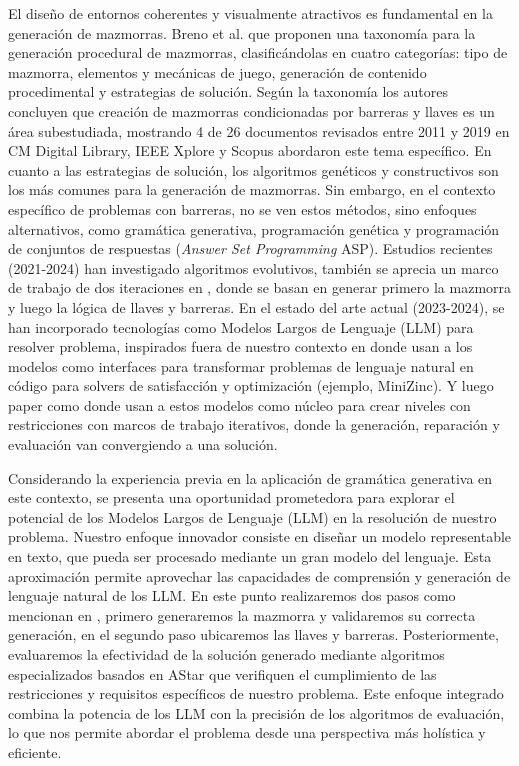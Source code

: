 \documentclass[letter, 10pt]{article}
\begin{document}
El dise\~no de entornos coherentes y visualmente atractivos es fundamental en la generaci\'on de mazmorras. Breno et al. \cite{viana2019PDG} que proponen una taxonom\'ia para la generaci\'on procedural de mazmorras, clasific\'andolas en cuatro categor\'ias: tipo de mazmorra, elementos y mec\'anicas de juego, generaci\'on de contenido procedimental y estrategias de soluci\'on. Seg\'un la taxonom\'ia los autores concluyen que creaci\'on de mazmorras condicionadas por barreras y llaves es un \'area subestudiada, mostrando 4 de 26 documentos revisados entre 2011 y 2019 en CM Digital Library, IEEE Xplore y Scopus abordaron este tema espec\'ifico. En cuanto a las estrategias de soluci\'on, los algoritmos gen\'eticos y constructivos son los m\'as comunes para la generaci\'on de mazmorras. Sin embargo, en el contexto espec\'ifico de problemas con barreras, no se ven estos m\'etodos, sino enfoques alternativos, como gram\'atica generativa, programaci\'on gen\'etica y programaci\'on de conjuntos de respuestas ({\it Answer Set Programming} ASP). Estudios recientes (2021-2024) \cite{Dumont2024,PEREIRA2021115009} han investigado algoritmos evolutivos, tambi\'en se aprecia un marco de trabajo de dos iteraciones en \cite{Dumont2024,10.1145/3337722.3341847}, donde se basan en generar primero la mazmorra y luego la l\'ogica de llaves y barreras. En el estado del arte actual (2023-2024), se han incorporado tecnolog\'ias como Modelos Largos de Lenguaje (LLM) para resolver problema, inspirados fuera de nuestro contexto en \cite{holygrail2.0} donde usan a los modelos como interfaces para transformar problemas de lenguaje natural en c\'odigo para solvers de satisfacci\'on y optimizaci\'on (ejemplo, MiniZinc). Y luego paper como \cite{word2world} donde usan a estos modelos como n\'ucleo para crear niveles con restricciones con marcos de trabajo iterativos, donde la generaci\'on, reparaci\'on y evaluaci\'on van convergiendo a una soluci\'on. 

Considerando la experiencia previa en la aplicaci\'on de gram\'atica generativa en este contexto, se presenta una oportunidad prometedora para explorar el potencial de los Modelos Largos de Lenguaje (LLM) en la resoluci\'on de nuestro problema. Nuestro enfoque innovador consiste en dise\~nar un modelo representable en texto, que pueda ser procesado mediante un gran modelo del lenguaje. Esta aproximaci\'on permite aprovechar las capacidades de comprensi\'on y generaci\'on de lenguaje natural de los LLM. En este punto realizaremos dos pasos como mencionan en \cite{Dumont2024,10.1145/3337722.3341847}, primero generaremos la mazmorra y validaremos su correcta generaci\'on, en el segundo paso ubicaremos las llaves y barreras. Posteriormente, evaluaremos la efectividad de la soluci\'on generado mediante algoritmos especializados basados en AStar que verifiquen el cumplimiento de las restricciones y requisitos espec\'ificos de nuestro problema. Este enfoque integrado combina la potencia de los LLM con la precisi\'on de los algoritmos de evaluaci\'on, lo que nos permite abordar el problema desde una perspectiva m\'as hol\'istica y eficiente. 
\end{document}
